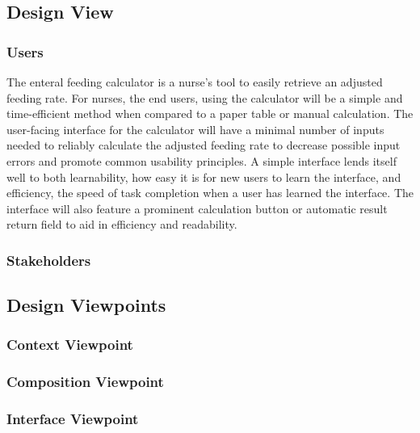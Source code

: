 \documentclass[onecolumn, draftclsnofoot,10pt, compsoc]{IEEEtran}
\begin{document}
\subsection{Design View}
\subsubsection{Users}
The enteral feeding calculator is a nurse's tool to easily retrieve an adjusted feeding rate.
For nurses, the end users, using the calculator will be a simple and time-efficient method when compared to a paper table or manual calculation.
The user-facing interface for the calculator will have a minimal number of inputs needed to reliably calculate the adjusted feeding rate to decrease possible input errors and promote common usability principles.
A simple interface lends itself well to both learnability, how easy it is for new users to learn the interface, and efficiency, the speed of task completion when a user has learned the interface.
The interface will also feature a prominent calculation button or automatic result return field to aid in efficiency and readability.
\subsubsection{Stakeholders}%


\subsection{Design Viewpoints}
\subsubsection{Context Viewpoint}

\subsubsection{Composition Viewpoint}

\subsubsection{Interface Viewpoint}
\end{document}

